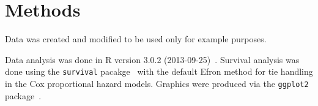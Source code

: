 % 
%
% 

\section{Methods \label{sec:methods}}

Data was created and modified to be used only for example purposes.  

Data analysis was done in 
R version 3.0.2 (2013-09-25)~\cite{R-base}.  Survival analysis
was done using the {\tt survival} pacakge~\cite{R-survival} with the default
Efron method for tie handling in the Cox proportional hazard models.  Graphics
were produced via the {\tt ggplot2} package~\cite{R-ggplot2}.




